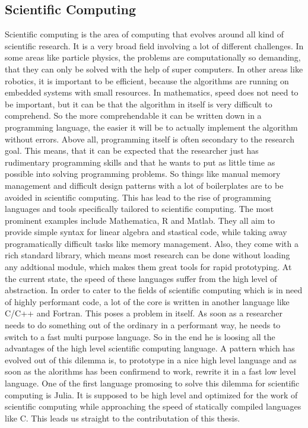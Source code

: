 \subsection{Scientific Computing}
Scientific computing is the area of computing that evolves around all kind of scientific research.
It is a very broad field involving a lot of different challenges. 
In some areas like particle physics, the problems are computationally so demanding, that they can only be solved with the help of super computers. 
In other areas like robotics, it is important to be efficient, because the algorithms are running on embedded systems with small resources. 
In mathematics, speed does not need to be important, but it can be that the algorithm in itself is very difficult to comprehend. 
So the more comprehendable it can be written down in a programming language, the easier it will be to actually implement the algorithm without errors.
Above all, programming itself is often secondary to the research goal.
This means, that it can be expected that the researcher just has rudimentary programming skills and that he wants to put as little time as possible into solving programming problems.
So things like manual memory management and difficult design patterns with a lot of boilerplates are to be avoided in scientific computing.
This has lead to the rise of programming languages and tools specifically tailored to scientific computing.
The most prominent examples include Mathematica, R and Matlab. 
They all aim to provide simple syntax for linear algebra and stastical code, while taking away programatically difficult tasks like memory management. Also, they come with a rich standard library, which means most research can be done without loading any addtional module, which makes them great tools for rapid prototyping.
At the current state, the speed of these languages suffer from the high level of abstraction. In order to cater to the fields of scientific computing which is in need of highly performant code, a lot of the core is written in another language like C/C++ and Fortran. This poses a problem in itself. 
As soon as a researcher needs to do something out of the ordinary in a performant way, he needs to switch to a fast multi purpose language. So in the end he is loosing all the advantages of the high level scientific computing language.
A pattern which has evolved out of this dilemma is, to prototype in a nice high level language and as soon as the alorithms has been confirmend to work, rewrite it in a fast low level language.
One of the first language promosing to solve this dilemma for scientific computing is Julia. It is supposed to be high level and optimized for the work of scientific computing while approaching the speed of statically compiled languages like C.
This leads us straight to the contributation of this thesis.

